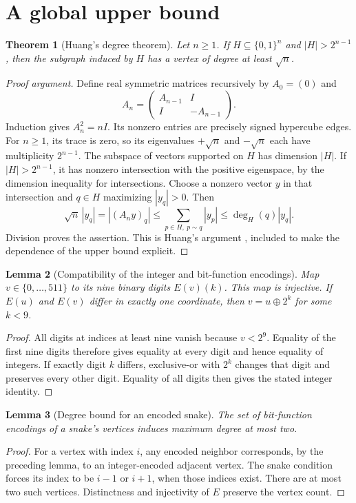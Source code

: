 \documentclass[11pt,a4paper]{article}
\newtheorem{theorem}{Theorem}[section]
\newtheorem{lemma}[theorem]{Lemma}
\theoremstyle{definition}
\theoremstyle{remark}
\begin{document}
\section{A global upper bound}
\begin{theorem}[Huang's degree theorem]\label{thm:huang}
Let $n\ge1$. If $H\subseteq\{0,1\}^n$ and $|H|>2^{n-1}$, then the subgraph induced by $H$ has a vertex of degree at least $\sqrt n$.
\end{theorem}
\begin{proof}[Proof argument]
Define real symmetric matrices recursively by $A_0=(0)$ and
\[
A_n=\begin{pmatrix}A_{n-1}&I\\I&-A_{n-1}\end{pmatrix}.
\]
Induction gives $A_n^2=nI$. Its nonzero entries are precisely signed hypercube edges. For $n\ge1$, its trace is zero, so its eigenvalues $+\sqrt n$ and $-\sqrt n$ each have multiplicity $2^{n-1}$. The subspace of vectors supported on $H$ has dimension $|H|$. If $|H|>2^{n-1}$, it has nonzero intersection with the positive eigenspace, by the dimension inequality for intersections. Choose a nonzero vector $y$ in that intersection and $q\in H$ maximizing $|y_q|>0$. Then
\[
\sqrt n\,|y_q|=|(A_ny)_q|
\le\sum_{p\in H,\ p\sim q}|y_p|
\le \deg_H(q)|y_q|.
\]
Division proves the assertion. This is Huang's argument \cite{huang}, included to make the dependence of the upper bound explicit.
\end{proof}

\begin{lemma}[Compatibility of the integer and bit-function encodings]
Map $v\in\{0,\ldots,511\}$ to its nine binary digits $E(v)(k)$. This map is injective. If $E(u)$ and $E(v)$ differ in exactly one coordinate, then $v=u\oplus2^k$ for some $k<9$.
\end{lemma}
\begin{proof}
All digits at indices at least nine vanish because $v<2^9$. Equality of the first nine digits therefore gives equality at every digit and hence equality of integers. If exactly digit $k$ differs, exclusive-or with $2^k$ changes that digit and preserves every other digit. Equality of all digits then gives the stated integer identity.
\end{proof}

\begin{lemma}[Degree bound for an encoded snake]
The set of bit-function encodings of a snake's vertices induces maximum degree at most two.
\end{lemma}
\begin{proof}
For a vertex with index $i$, any encoded neighbor corresponds, by the preceding lemma, to an integer-encoded adjacent vertex. The snake condition forces its index to be $i-1$ or $i+1$, when those indices exist. There are at most two such vertices. Distinctness and injectivity of $E$ preserve the vertex count.
\end{proof}
\end{document}
